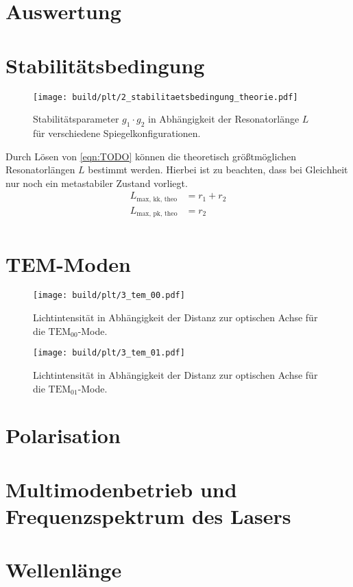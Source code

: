\section{Auswertung}
\label{sec:auswertung}

\section{Stabilitätsbedingung}
\lipsum[1]

\begin{figure}
  \centering
   \texttt{[image: build/plt/2\_stabilitaetsbedingung\_theorie.pdf]}
   \caption{Stabilitätsparameter $g_1 \cdot g_2$ in Abhängigkeit der Resonatorlänge $L$ für verschiedene Spiegelkonfigurationen.}
   \label{fig:plt:stabilitaetsbedingung_theorie}
\end{figure}

Durch Lösen von \autoref{eqn:TODO} können die theoretisch größtmöglichen Resonatorlängen $L$ bestimmt werden.
Hierbei ist zu beachten, dass bei Gleichheit nur noch ein metastabiler Zustand vorliegt.
\begin{align*}
    L_\text{max, kk, theo} &= r_1 + r_2 \\
    L_\text{max, pk, theo} &= r_2 \\
\end{align*}


\section{TEM-Moden}
\lipsum[1]

\begin{figure}
  \centering
   \texttt{[image: build/plt/3\_tem\_00.pdf]}
   \caption{Lichtintensität in Abhängigkeit der Distanz zur optischen Achse für die $\text{TEM}_{00}$-Mode.}
   \label{fig:plt:tem_00}
\end{figure}

\begin{figure}
  \centering
   \texttt{[image: build/plt/3\_tem\_01.pdf]}
   \caption{Lichtintensität in Abhängigkeit der Distanz zur optischen Achse für die $\text{TEM}_{01}$-Mode.}
   \label{fig:plt:tem_01}
\end{figure}


\section{Polarisation}
\lipsum[1]


\section{Multimodenbetrieb und Frequenzspektrum des Lasers}


\section{Wellenlänge}
\lipsum[1]

